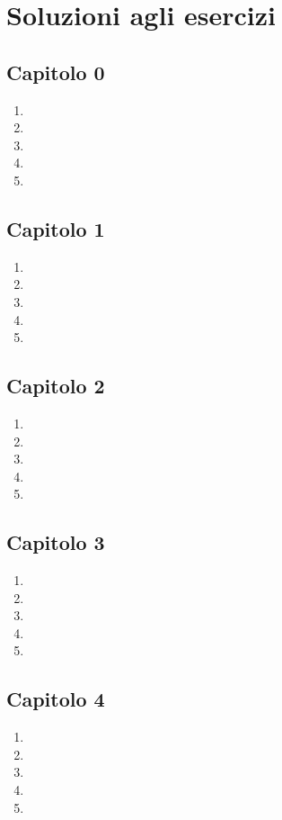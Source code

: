 
\chapter{Soluzioni agli esercizi}
\section*{Capitolo 0}
\begin{enumerate}
	\item
	\item
	\item
	\item
	\item
\end{enumerate}
\section*{Capitolo 1}
\begin{enumerate}
	\item
	\item
	\item
	\item
	\item
\end{enumerate}
\section*{Capitolo 2}
\begin{enumerate}
	\item
	\item
	\item
	\item
	\item
\end{enumerate}
\section*{Capitolo 3}
\begin{enumerate}
	\item
	\item
	\item
	\item
	\item
\end{enumerate}
\section*{Capitolo 4}
\begin{enumerate}
	\item
	\item
	\item
	\item
	\item
\end{enumerate}

